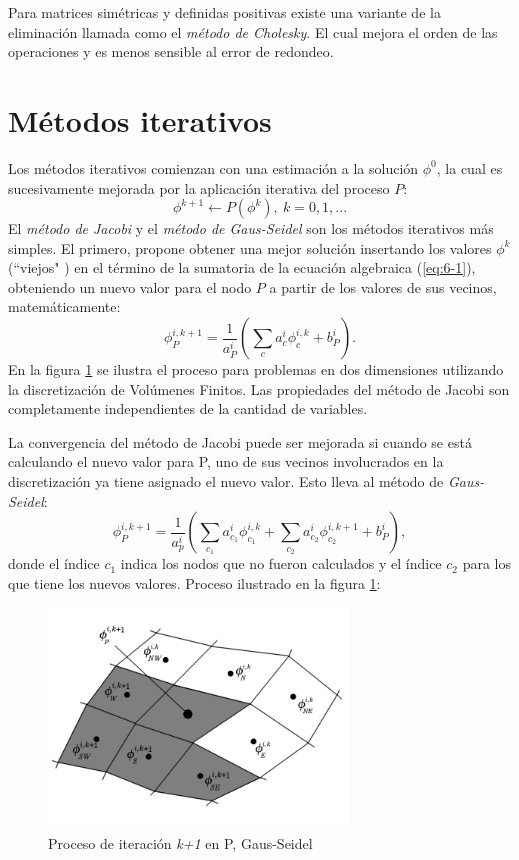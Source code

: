 \documentclass[a4paper,10pt, oneside]{book}
\begin{document}
Para matrices simétricas y definidas positivas existe una variante de la eliminación llamada como el \textit{método de Cholesky}. El cual mejora el orden de las operaciones y es menos sensible al error de redondeo.

\section{Métodos iterativos}

Los métodos iterativos comienzan con una estimación a la solución $\phi^0$, la cual es sucesivamente mejorada por la aplicación iterativa del proceso $P$:
\begin{equation}
	\phi^{k+1} \longleftarrow P(\phi^k), ~ k=0,1,... \nonumber
\end{equation}
El \textit{método de Jacobi} y el \textit{método de Gaus-Seidel} son los métodos iterativos más simples. El primero, propone obtener una mejor solución insertando los valores $\phi^k$ (``viejos" ) en el término de la sumatoria de la ecuación algebraica (\ref{eq:6-1}), obteniendo un nuevo valor para el nodo $P$ a partir de los valores de sus vecinos, matemáticamente:
\begin{equation}
	\phi_P^{i,k+1} = \frac{1}{a_P^i} \left( \sum_c a_c^i \phi_c^{i,k} + b_P^i \right). \nonumber
\end{equation}
En la figura \ref{img:6-1} se ilustra el proceso para problemas en dos dimensiones utilizando la discretización de Volúmenes Finitos. Las propiedades del método de Jacobi son completamente independientes de la cantidad de variables.

La convergencia del método de Jacobi puede ser mejorada si cuando se está calculando el nuevo valor para P, uno de sus vecinos involucrados en la discretización ya tiene asignado el nuevo valor. Esto lleva al método de \textit{Gaus-Seidel}:
\begin{equation}
	\phi_P^{i,k+1} = \frac{1}{a_p^i} \left( \sum_{c_1} a_{c_1}^i \phi_{c_1}^{i,k} + \sum_{c_2} a_{c_2}^i  \phi_{c_2}^{i,k+1} + b_P^i \right), \nonumber  
\end{equation}
donde el índice $c_1$ indica los nodos que no fueron calculados y el índice $c_2$ para los que tiene los nuevos valores. Proceso ilustrado en la figura \ref{img:6-1}:
\begin{figure}[h!]
	\centering
	\includegraphics[width=8cm]{Img/6-1}
	\caption{Proceso de iteración \textit{k+1} en P, Gaus-Seidel}
	\label{img:6-1}
\end{figure}
\end{document}
